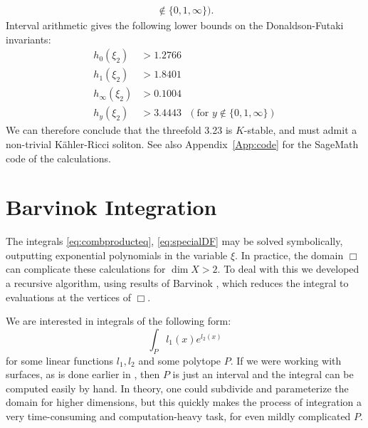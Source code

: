 \begin{example}
{\begin{align*}
\not \in \{0,1,\infty\} ).
\end{align*}}
Interval arithmetic gives the following lower bounds on the Donaldson-Futaki invariants:
\begin{align*}
h_0(\xi_2) &> 1.2766 \\
h_1(\xi_2) &> 1.8401 \\
h_\infty(\xi_2) &> 0.1004 \\
h_y(\xi_2) &> 3.4443 \ \ \  ( \text{for } y 
\not \in \{0,1,\infty\} )
\end{align*}
We can therefore conclude that the threefold 3.23 is \(K\)-stable, and must admit a non-trivial K\"ahler-Ricci soliton. See also Appendix~\ref{App:code} for the SageMath code of the calculations.
\end{example}

\section{Barvinok Integration} \label{sec:barvinok}
The integrals \ref{eq:combproducteq}, \ref{eq:specialDF} may be solved symbolically, outputting exponential polynomials in the variable \(\xi\). In practice, the domain \(\Box\) can complicate these calculations for \(\dim X > 2\). To deal with this we developed a recursive algorithm, using results of Barvinok \cite{Barvinok1992}, which reduces the integral to evaluations at the vertices of \(\Box\).

We are interested in integrals of the following form:
\begin{equation} \label{eq:barintegral1}
\int_{P} l_1(x) e^{l_2(x)}
\end{equation}
for some linear functions \(l_1,l_2\) and some polytope \(P\). If we were working with surfaces, as is done earlier in \cite{cable2018classification}, then \(P\) is just an interval and the integral can be computed easily by hand. In theory, one could subdivide and parameterize the domain for higher dimensions, but this quickly makes the process of integration a very time-consuming and computation-heavy task, for even mildly complicated \(P\).

